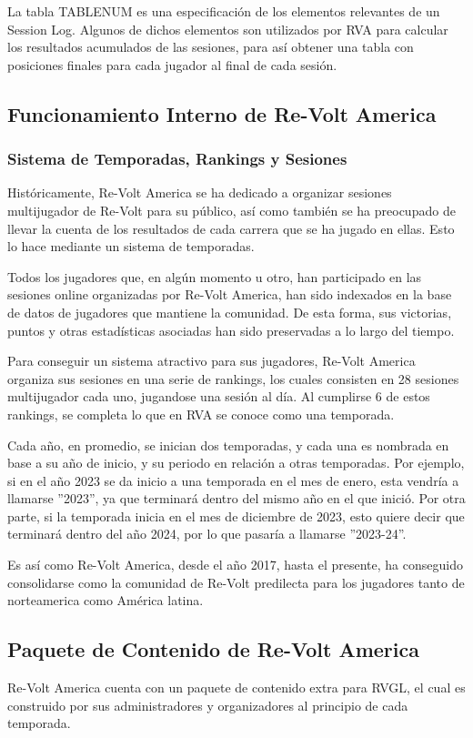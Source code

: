 La tabla TABLENUM es una especificación de los elementos relevantes de un Session Log. Algunos de dichos elementos son utilizados por RVA para calcular los resultados acumulados de las sesiones, para así obtener una tabla con posiciones finales para cada jugador al final de cada sesión.

\subsection{Funcionamiento Interno de Re-Volt America}

\subsubsection{Sistema de Temporadas, Rankings y Sesiones}
Históricamente, Re-Volt America se ha dedicado a organizar sesiones multijugador de Re-Volt para su público, así como también se ha preocupado de llevar la cuenta de los resultados de cada carrera que se ha jugado en ellas. Esto lo hace mediante un sistema de temporadas.

Todos los jugadores que, en algún momento u otro, han participado en las sesiones online organizadas por Re-Volt America, han sido indexados en la base de datos de jugadores que mantiene la comunidad. De esta forma, sus victorias, puntos y otras estadísticas asociadas han sido preservadas a lo largo del tiempo.

Para conseguir un sistema atractivo para sus jugadores, Re-Volt America organiza sus sesiones en una serie de rankings, los cuales consisten en 28 sesiones multijugador cada uno, jugandose una sesión al día. Al cumplirse 6 de estos rankings, se completa lo que en RVA se conoce como una temporada.

Cada año, en promedio, se inician dos temporadas, y cada una es nombrada en base a su año de inicio, y su periodo en relación a otras temporadas. Por ejemplo, si en el año 2023 se da inicio a una temporada en el mes de enero, esta vendría a llamarse ''2023'', ya que terminará dentro del mismo año en el que inició. Por otra parte, si la temporada inicia en el mes de diciembre de 2023, esto quiere decir que terminará dentro del año 2024, por lo que pasaría a llamarse ''2023-24''.

Es así como Re-Volt America, desde el año 2017, hasta el presente, ha conseguido consolidarse como la comunidad de Re-Volt predilecta para los jugadores tanto de norteamerica como América latina.

\subsection{Paquete de Contenido de Re-Volt America}
Re-Volt America cuenta con un paquete de contenido extra para RVGL, el cual es construido por sus administradores y organizadores al principio de cada temporada.

